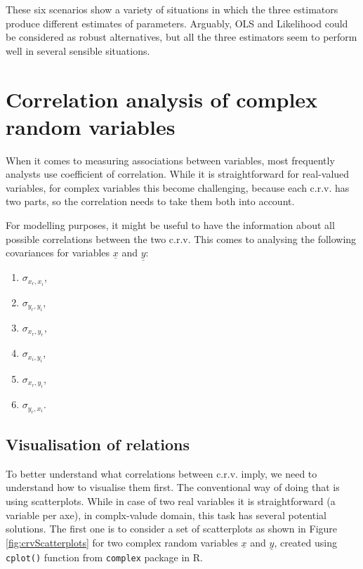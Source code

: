 \documentclass[
]{book}
\providecommand{\tightlist}{%
  \setlength{\itemsep}{0pt}\setlength{\parskip}{0pt}}
\begin{document}
These six scenarios show a variety of situations in which the three estimators produce different estimates of parameters. Arguably, OLS and Likelihood could be considered as robust alternatives, but all the three estimators seem to perform well in several sensible situations.

\hypertarget{correlationAnalysis}{%
\chapter{Correlation analysis of complex random variables}\label{correlationAnalysis}}

When it comes to measuring associations between variables, most frequently analysts use coefficient of correlation. While it is straightforward for real-valued variables, for complex variables this become challenging, because each c.r.v. has two parts, so the correlation needs to take them both into account.

For modelling purposes, it might be useful to have the information about all possible correlations between the two c.r.v. This comes to analysing the following covariances for variables \(\underline{x}\) and \(\underline{y}\):

\begin{enumerate}
\def\labelenumi{\arabic{enumi}.}
\tightlist
\item
  \(\sigma_{x_r,x_i}\),
\item
  \(\sigma_{y_r,y_i}\),
\item
  \(\sigma_{x_r,y_r}\),
\item
  \(\sigma_{x_i,y_i}\),
\item
  \(\sigma_{x_r,y_i}\),
\item
  \(\sigma_{y_r,x_i}\).
\end{enumerate}

\hypertarget{correlationVisual}{%
\section{Visualisation of relations}\label{correlationVisual}}

To better understand what correlations between c.r.v. imply, we need to understand how to visualise them first. The conventional way of doing that is using scatterplots. While in case of two real variables it is straightforward (a variable per axe), in complx-valude domain, this task has several potential solutions. The first one is to consider a set of scatterplots as shown in Figure \ref{fig:crvScatterplots} for two complex random variables \(\underline{x}\) and \(\underline{y}\), created using \texttt{cplot()} function from \texttt{complex} package in R.
\end{document}
